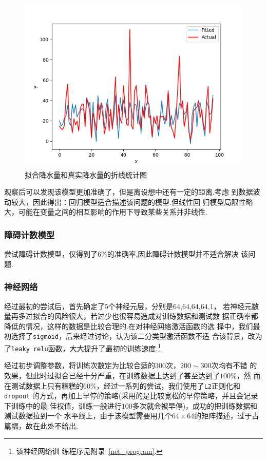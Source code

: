 \documentclass[UTF8, a4paper]{ctexart}
\begin{document}
\begin{figure}[h!]
	\centering
	\includegraphics[scale=0.3]{fit2.png}
	\caption{拟合降水量和真实降水量的折线统计图}
\end{figure}

观察后可以发现该模型更加准确了，但是离设想中还有一定的距离.考虑
到数据波动较大，因此得出：回归模型适合描述该问题的模型.但线性回
归模型局限性略大，可能在变量之间的相互影响的作用下导致某些关系并非线性.

\subsubsection{障碍计数模型}

尝试障碍计数模型，仅得到了$6\%$的准确率,因此障碍计数模型并不适合解决
该问题.

\subsubsection{神经网络}

经过最初的尝试后，首先确定了$5$个神经元层，分别是$64$,$64$,$64$,$64$,$1$，
若神经元数量再多过拟合的风险很大，若过少也很容易造成对训练数据和测试数
据正确率都降低的情况，这样的数据是比较合理的.在对神经网络激活函数的选
择中，我们最初选择了\verb+sigmoid+，后来经过讨论，认为该二分类型激活函数不适
合该背景，改为了\verb+leaky relu+函数，大大提升了最初的训练速度.\footnote{该神经网络训
	练程序见附录~\textcolor{red}{\ref{net_program}}.}

经过初步调整参数，将训练次数定为比较合适的$300$次，$200\sim300$次均有不错
的效果，但此时过拟合已经十分严重，在训练数据上达到了甚至达到了$100\%$，然
而在测试数据上只有糟糕的$60\%$，经过一系列的尝试，我们使用了\verb+L2+正则化和\verb+dropout+
的方式，再加上早停的策略(采用的是比较宽松的早停策略，并且会记录下训练中的最
佳权值，训练一般进行$100$多次就会被早停)，成功的把训练数据和测试数据拉到一个
水平线上，由于该模型需要用几个$64\times64$的矩阵描述，过于占篇幅，故在此处不给出.
\end{document}
